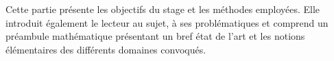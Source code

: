Cette partie présente les objectifs du stage et les méthodes employées.
Elle introduit également le lecteur au sujet, à ses problématiques et comprend un préambule mathématique 
présentant un bref état de l'art et les notions élémentaires des différents domaines convoqués.